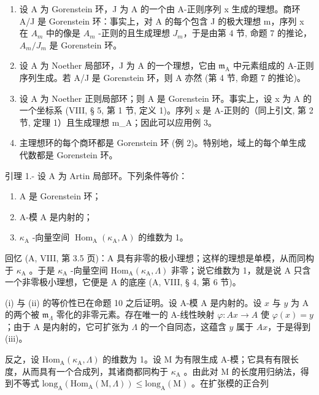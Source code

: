\begin{enumerate}
\def\labelenumi{\arabic{enumi})}
\setcounter{enumi}{1}
\item
  设 A 为 Gorenstein 环，J 为 A 的一个由 A-正则序列 x 生成的理想。商环 A/J 是 Gorenstein 环：事实上，对 A 的每个包含 J 的极大理想 m，序列 x 在 \(A_{m}\) 中的像是 \(A_{m}\) -正则的且生成理想 \(J_{m}\)，于是由第 4 节, 命题 7 的推论，\(A_{m}/J_{m}\) 是 Gorenstein 环。
\item
  设 A 为 Noether 局部环，J 为 A 的一个理想，它由 \(\mathfrak{m}_{\mathrm{A}}\) 中元素组成的 A-正则序列生成。若 A/J 是 Gorenstein 环，则 A 亦然 (第 4 节, 命题 7 的推论)。
\item
  设 A 为 Noether 正则局部环；则 A 是 Gorenstein 环。事实上，设 x 为 A 的一个坐标系 (VIII, § 5, 第 1 节, 定义 1)。序列 x 是 A-正则的（同上引文, 第 2 节, 定理 1）且生成理想 m\_A；因此可以应用例 3。
\item
  主理想环的每个商环都是 Gorenstein 环 (例 2)。特别地，域上的每个单生成代数都是 Gorenstein 环。
\end{enumerate}

引理 1.- 设 A 为 Artin 局部环。下列条件等价：

\begin{enumerate}
\def\labelenumi{(\roman{enumi})}
\item
  A 是 Gorenstein 环；
\item
  A-模 A 是内射的；
\item
  \(\kappa_{\mathrm{A}}\) -向量空间 \(\operatorname{Hom}_{\mathrm{A}}(\kappa_{\mathrm{A}}, \mathrm{A})\) 的维数为 1。
\end{enumerate}

回忆 (A, VIII, 第 3.5 页)：A 具有非零的极小理想；这样的理想是单模，从而同构于 \(\kappa_{\mathrm{A}}\) 。于是 \(\kappa_{\mathrm{A}}\) -向量空间 \(\mathrm{Hom}_{\mathrm{A}}(\kappa_{\mathrm{A}}, \Lambda)\) 非零；说它维数为 1，就是说 A 只含一个非零极小理想，它便是 A 的底座 (A, VIII, § 4, 第 6 节)。

(i) 与 (ii) 的等价性已在命题 10 之后证明。设 A-模 A 是内射的。设 \(x\) 与 \(y\) 为 A 的两个被 \(\mathfrak{m}_{\Lambda}\) 零化的非零元素。存在唯一的 A-线性映射 \(\varphi : Ax \to A\) 使 \(\varphi(x) = y\) ；由于 A 是内射的，它可扩张为 \(\Lambda\) 的一个自同态，这蕴含 \(y\) 属于 \(Ax\)，于是得到 (iii)。

反之，设 \(\mathrm{Hom}_{\mathrm{A}}(\kappa_{\mathrm{A}},\Lambda)\) 的维数为 1。设 M 为有限生成 A-模；它具有有限长度，从而具有一个合成列，其诸商都同构于 \(\kappa_{\mathrm{A}}\) 。由此对 M 的长度用归纳法，得到不等式 \(\mathrm{long}_{\mathrm{A}}(\mathrm{Hom}_{\mathrm{A}}(\mathrm{M},\Lambda)) \leqslant \mathrm{long}_{\mathrm{A}}(\mathrm{M})\) 。在扩张模的正合列

